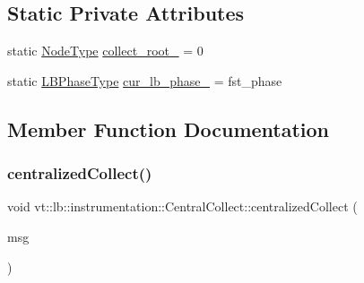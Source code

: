 \subsection*{Static Private Attributes}
\begin{DoxyCompactItemize}
\item 
static \hyperlink{namespacevt_a866da9d0efc19c0a1ce79e9e492f47e2}{Node\+Type} \hyperlink{structvt_1_1lb_1_1instrumentation_1_1_central_collect_a9c395f1e54e3d861a1e1778592bd583b}{collect\+\_\+root\+\_\+} = 0
\item 
static \hyperlink{namespacevt_a5505d0bab25ce2ff566a8e015871b379}{L\+B\+Phase\+Type} \hyperlink{structvt_1_1lb_1_1instrumentation_1_1_central_collect_a7bf1388c3c36830e325a2de49c51d903}{cur\+\_\+lb\+\_\+phase\+\_\+} = fst\+\_\+phase
\end{DoxyCompactItemize}


\subsection{Member Function Documentation}
\mbox{\label{structvt_1_1lb_1_1instrumentation_1_1_central_collect_a08855053af75446a7bc080592126bb1a}} 
\subsubsection{\texorpdfstring{centralized\+Collect()}{centralizedCollect()}}
{\footnotesize\ttfamily void vt\+::lb\+::instrumentation\+::\+Central\+Collect\+::centralized\+Collect (\begin{DoxyParamCaption}\item[{\hyperlink{structvt_1_1lb_1_1instrumentation_1_1_collect_msg}{Collect\+Msg} $\ast$}]{msg }\end{DoxyParamCaption})\hspace{0.3cm}{\ttfamily [static]}}

\mbox{\label{structvt_1_1lb_1_1instrumentation_1_1_central_collect_a3b41c4af5113e069d87d5d10e3c7ae59}} 
